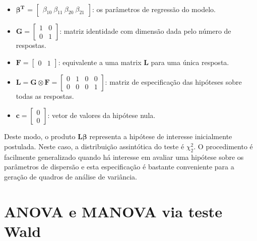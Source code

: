 \begin{itemize}
  
  \item $\boldsymbol{\beta^{T}}$ = $\begin{bmatrix} \beta_{10} \  \beta_{11} \  \beta_{20} \  \beta_{21} \end{bmatrix}$: os parâmetros de regressão do modelo.


\item $\boldsymbol{G} = \begin{bmatrix} 1 & 0 \\ 0 & 1  \end{bmatrix}$: matriz identidade com dimensão dada pelo número de respostas.

\item $\boldsymbol{F} = \begin{bmatrix} 0 & 1 \end{bmatrix}$: equivalente a uma matrix $\boldsymbol{L}$ para uma única resposta.

\item $\boldsymbol{L} = \boldsymbol{G} \otimes \boldsymbol{F} =  \begin{bmatrix} 0 & 1 & 0 & 0 \\
0 & 0 & 0 & 1 \end{bmatrix}$: matriz de especificação das hipóteses sobre todas as respostas.
 
\item $\boldsymbol{c} = \begin{bmatrix} 0 \\ 0 \end{bmatrix}$: vetor de valores da hipótese nula.

\end{itemize}

Deste modo, o produto $\boldsymbol{L}\boldsymbol{\beta}$ representa a hipótese de interesse inicialmente postulada. Neste caso, a distribuição assintótica do teste é $\chi^2_2$. O procedimento é facilmente generalizado quando há interesse em avaliar uma hipótese sobre os parâmetros de dispersão e esta especificação é bastante conveniente para a geração de quadros de análise de variância.


\section{ANOVA e MANOVA via teste Wald}

